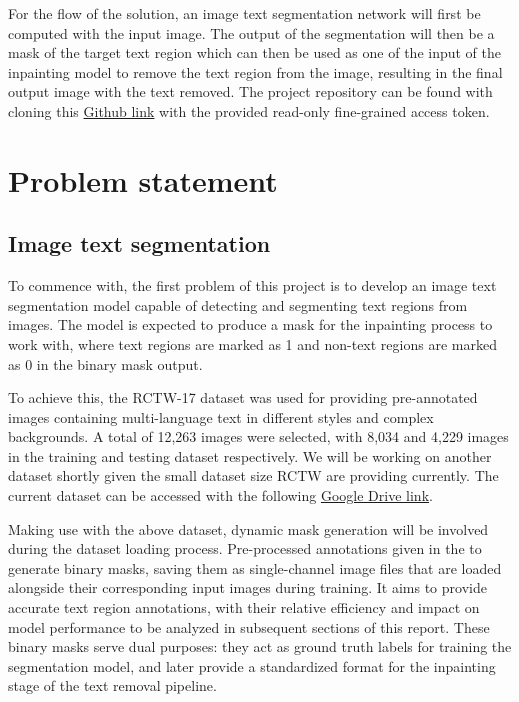 \documentclass[10pt,twocolumn,letterpaper]{article}
\begin{document}
For the flow of the solution, an image text segmentation network will first be computed with the input image.
The output of the segmentation will then be a mask of the target text region which can then be used as one of the input of the 
inpainting model to remove the text region from the image, resulting in the final output image with the text removed. The 
project repository can be found with cloning this 
\href{https://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@github.com/GLGDLY/ELEC4240_project}{Github link} 
with the provided read-only fine-grained access token.

\section{Problem statement}

\subsection{Image text segmentation}
To commence with, the first problem of this project is to develop an image text segmentation model capable of detecting and segmenting text regions from images. 
The model is expected to produce a mask for the inpainting process to work with, where text regions are marked as 1 and non-text regions are marked as 0 in the binary mask output.

To achieve this, the RCTW-17 dataset was used for providing pre-annotated images containing multi-language text in different styles and complex backgrounds.
A total of 12,263 images were selected, with 8,034 and 4,229 images in the training and testing dataset respectively. 
We will be working on another dataset shortly given the small dataset size RCTW are providing currently. The current dataset can be accessed with the following 
\href{https://drive.google.com/drive/folders/1BbLe23KN1At6xsItvBcj9dXhPv6LdQH_?usp=sharing}{Google Drive link}.

Making use with the above dataset, dynamic mask generation will be involved during the dataset loading process. 
Pre-processed annotations given in the to generate binary masks, saving them as single-channel image files that are loaded alongside their corresponding input images during training. 
It aims to provide accurate text region annotations, with their relative efficiency and impact on model performance to be analyzed in subsequent sections of this report. 
These binary masks serve dual purposes: they act as ground truth labels for training the segmentation model, and later provide a standardized format for the inpainting stage of the text removal pipeline.
\end{document}
